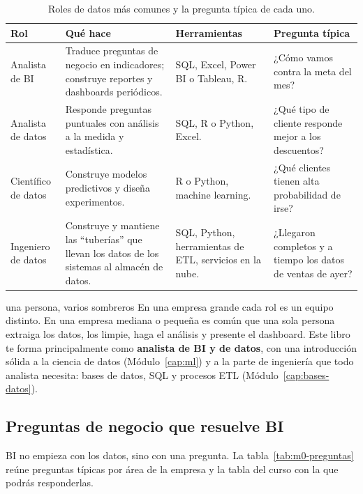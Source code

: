 \begin{table}[H]
\centering\small
\caption{Roles de datos más comunes y la pregunta típica de cada uno.}
\label{tab:m0-roles}
\begin{tabularx}{\textwidth}{@{}>{\raggedright\arraybackslash}p{2.3cm}
    >{\raggedright\arraybackslash}X
    >{\raggedright\arraybackslash}p{3.1cm}
    >{\raggedright\arraybackslash}p{3.6cm}@{}}
\toprule
\textbf{Rol} & \textbf{Qué hace} & \textbf{Herramientas} &
\textbf{Pregunta típica} \\
\midrule
Analista de BI &
  Traduce preguntas de negocio en indicadores; construye reportes y
  dashboards periódicos. &
  SQL, Excel, Power BI o Tableau, R. &
  ¿Cómo vamos contra la meta del mes? \\
\addlinespace
Analista de datos &
  Responde preguntas puntuales con análisis a la medida y estadística. &
  SQL, R o Python, Excel. &
  ¿Qué tipo de cliente responde mejor a los descuentos? \\
\addlinespace
Científico de datos &
  Construye modelos predictivos y diseña experimentos. &
  R o Python, machine learning. &
  ¿Qué clientes tienen alta probabilidad de irse? \\
\addlinespace
Ingeniero de datos &
  Construye y mantiene las ``tuberías'' que llevan los datos de los
  sistemas al almacén de datos. &
  SQL, Python, herramientas de ETL, servicios en la nube. &
  ¿Llegaron completos y a tiempo los datos de ventas de ayer? \\
\bottomrule
\end{tabularx}
\end{table}

\begin{negocio}{una persona, varios sombreros}
En una empresa grande cada rol es un equipo distinto. En una empresa mediana
o pequeña es común que una sola persona extraiga los datos, los limpie, haga
el análisis y presente el dashboard. Este libro te forma principalmente como
\textbf{analista de BI y de datos}, con una introducción sólida a la ciencia
de datos (Módulo~\ref{cap:ml}) y a la parte de ingeniería que todo analista
necesita: bases de datos, SQL y procesos ETL (Módulo~\ref{cap:bases-datos}).
\end{negocio}

\subsection{Preguntas de negocio que resuelve BI}

BI no empieza con los datos, sino con una pregunta. La
tabla~\ref{tab:m0-preguntas} reúne preguntas típicas por área de la empresa y
la tabla del curso con la que podrás responderlas.

